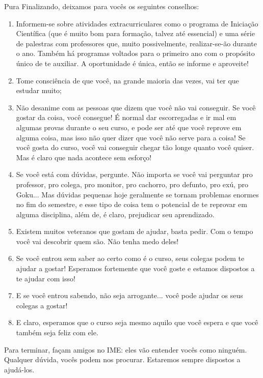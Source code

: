 \begin{subsecao}{Pura}
Finalizando, deixamos para vocês os seguintes conselhos:
\begin{enumerate}

\item Informem-se sobre atividades extracurriculares como o programa de
Iniciação Científica (que é muito bom para formação, talvez até essencial) e
uma série de palestras com professores que, muito possivelmente, realizar-se-ão
durante o ano. Também há programas voltados para o primeiro ano com o propósito único de te auxiliar. A oportunidade é única, então se informe e aproveite!
\item Tome consciência de que você, na grande maioria das vezes, vai ter que
estudar muito;
\item Não desanime com as pessoas que dizem que você não vai conseguir. Se 
você gostar da coisa, você consegue! É normal dar escorregadas e ir mal em algumas 
provas durante o seu curso, e pode ser até que você reprove em alguma coisa, 
mas isso não quer dizer que você não serve para a coisa! Se você gosta do curso, 
você vai conseguir chegar tão longe quanto você quiser. Mas é claro que nada 
acontece sem esforço!
\item Se você está com dúvidas, pergunte. Não importa se você vai perguntar 
pro professor, pro colega, pro monitor, pro cachorro, pro defunto, pro exú, pro 
Goku... Mas dúvidas pequenas hoje geralmente se tornam problemas enormes 
no fim do semestre, e esse tipo de coisa tem o potencial de te reprovar em alguma 
disciplina, além de, é claro, prejudicar seu aprendizado.
\item Existem muitos veteranos que gostam de ajudar, basta pedir. Com o tempo 
você vai descobrir quem são. Não tenha medo deles!
\item Se você entrou sem saber ao certo como é o curso, seus colegas podem 
te ajudar a gostar! Esperamos fortemente que você goste e estamos dispostos a te ajudar com isso!
\item E se você entrou sabendo, não seja arrogante... você pode ajudar os seus 
colegas a gostar! 
\item E claro, esperamos que o curso seja mesmo aquilo que você 
espera e que você também seja feliz com ele.

\end{enumerate}
Para terminar, façam amigos no IME: eles vão entender vocês como ninguém. Qualquer dúvida,
vocês podem nos procurar. Estaremos sempre dispostos a ajudá-los.

\end{subsecao}
